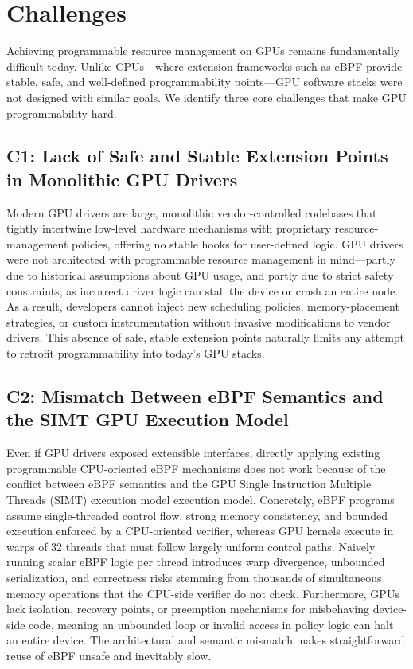 \section{Challenges}
\label{sec:challenges}
Achieving programmable resource management on GPUs remains fundamentally difficult today. 
Unlike CPUs—where extension frameworks such as eBPF provide stable, safe, and well-defined programmability points—GPU software stacks were not designed with similar goals. 
We identify three core challenges that make GPU programmability hard.

\subsection{C1: Lack of Safe and Stable Extension Points in Monolithic GPU Drivers}
Modern GPU drivers are large, monolithic vendor-controlled codebases that tightly intertwine low-level hardware mechanisms with proprietary resource-management policies, offering no stable hooks for user-defined logic. 
GPU drivers were not architected with programmable resource management in mind—partly due to historical assumptions about GPU usage, and partly due to strict safety constraints, as incorrect driver logic can stall the device or crash an entire node. 
As a result, developers cannot inject new scheduling policies, memory-placement strategies, or custom instrumentation without invasive modifications to vendor drivers. This absence of safe, stable extension points naturally limits any attempt to retrofit programmability into today's GPU stacks.

\subsection{C2: Mismatch Between eBPF Semantics and the SIMT GPU Execution Model}

Even if GPU drivers exposed extensible interfaces, directly applying existing programmable CPU-oriented eBPF mechanisms does not work because of the conflict between eBPF semantics and the GPU Single Instruction Multiple Threads (SIMT) execution model execution model. 
Concretely, eBPF programs assume single-threaded control flow, strong memory consistency, and bounded execution enforced by a CPU-oriented verifier, whereas GPU kernels execute in warps of 32 threads that must follow largely uniform control paths. 
Naively running scalar eBPF logic per thread introduces warp divergence, unbounded serialization, and correctness risks stemming from thousands of simultaneous memory operations that the CPU-side verifier do not check. 
Furthermore, GPUs lack isolation, recovery points, or preemption mechanisms for misbehaving device-side code, meaning an unbounded loop or invalid access in policy logic can halt an entire device. 
The architectural and semantic mismatch makes straightforward reuse of eBPF unsafe and inevitably slow.

